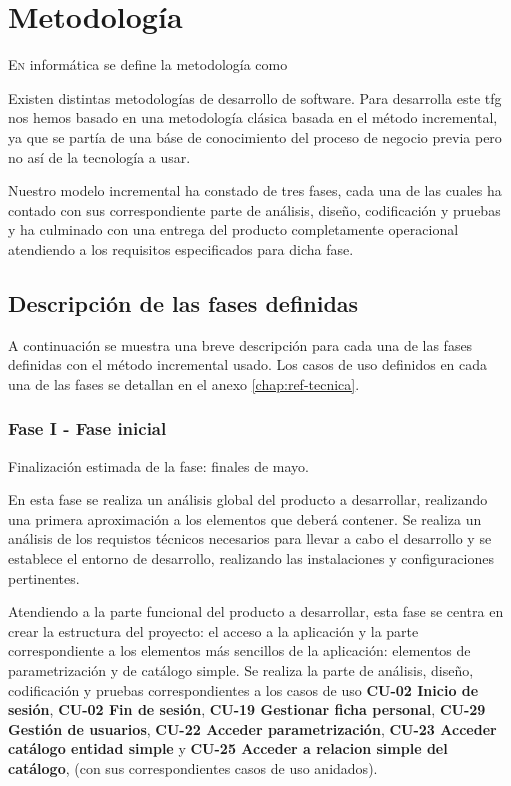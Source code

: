 \chapter{Metodología}
\label{chap:metodologia}

\lettrine{E} {n} informática se define la metodología como 

Existen distintas metodologías de desarrollo de software. Para desarrolla este \acrshort{tfg} nos hemos basado en una metodología clásica basada en el método incremental, ya que se partía de una báse de conocimiento del proceso de negocio previa pero no así de la tecnología a usar.

Nuestro modelo incremental ha constado de tres fases, cada una de las cuales ha contado con sus correspondiente parte de análisis, diseño, codificación y pruebas y ha culminado con una entrega del producto completamente operacional atendiendo a los requisitos especificados para dicha fase.

\section{Descripción de las fases definidas}
\label{sec:metodologia-fases}

A continuación se muestra una breve descripción para cada una de las fases definidas con el método incremental usado. Los casos de uso definidos en cada una de las fases se detallan en el anexo \ref{chap:ref-tecnica}.

\subsection{Fase I - Fase inicial}
Finalización estimada de la fase: finales de mayo.

En esta fase se realiza un análisis global del producto a desarrollar, realizando una primera aproximación a los elementos que deberá contener.
Se realiza un análisis de los requistos técnicos necesarios para llevar a cabo el desarrollo y se establece el entorno de desarrollo, realizando las instalaciones y configuraciones pertinentes. 

Atendiendo a la parte funcional del producto a desarrollar, esta fase se centra en crear la estructura del proyecto: el acceso a la aplicación y la parte correspondiente a los elementos más sencillos de la aplicación: elementos de parametrización y de catálogo simple. Se realiza la parte de análisis, diseño, codificación y pruebas correspondientes a los casos de uso \textbf{CU-02 Inicio de sesión}, \textbf{CU-02 Fin de sesión}, \textbf{CU-19 Gestionar ficha personal}, \textbf{CU-29 Gestión de usuarios}, \textbf{CU-22 Acceder parametrización}, \textbf{CU-23 Acceder catálogo entidad simple} y \textbf{CU-25 Acceder a relacion simple del catálogo}, (con sus correspondientes casos de uso anidados). 


